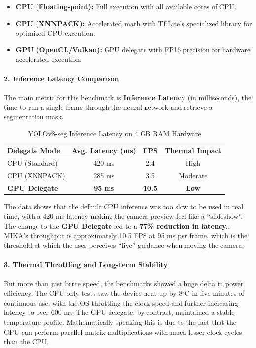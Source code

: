 \documentclass[12pt,a4paper]{report}
\begin{document}
\begin{itemize}
    \item \textbf{CPU (Floating-point):} Full execution with all available cores of CPU.
    \item \textbf{CPU (XNNPACK):} Accelerated math with TFLite’s specialized library for optimized CPU execution.
    \item \textbf{GPU (OpenCL/Vulkan):} GPU delegate with FP16 precision for hardware accelerated execution.
\end{itemize}
 
\paragraph{2. Inference Latency Comparison}
The main metric for this benchmark is \textbf{Inference Latency} (in milliseconds), the time to run a single frame through the neural network and retrieve a segmentation mask.
\begin{table}[h!]
\centering
\caption{YOLOv8-seg Inference Latency on 4 GB RAM Hardware}
\begin{tabular}{|l|c|c|c|}
\hline
\textbf{Delegate Mode} & \textbf{Avg. Latency (ms)} & \textbf{FPS} & \textbf{Thermal Impact} \\ \hline
CPU (Standard) & 420 ms & 2.4 & High \\ \hline
CPU (XNNPACK) & 285 ms & 3.5 & Moderate \\ \hline
\textbf{GPU Delegate} & \textbf{95 ms} & \textbf{10.5} & \textbf{Low} \\ \hline
\end{tabular}
\end{table}
 
The data shows that the default CPU inference was too slow to be used in real time, with a 420 ms latency making the camera preview feel like a “slideshow”. The change to the \textbf{GPU Delegate} led to a \textbf{77\% reduction in latency.}. MIKA's throughput is approximately 10.5 FPS at 95 ms per frame, which is the threshold at which the user perceives “live” guidance when moving the camera.



 
\paragraph{3. Thermal Throttling and Long-term Stability}

But more than just brute speed, the benchmarks showed a huge delta in power efficiency. The CPU-only tests saw the device heat up by 8°C in five minutes of continuous use, with the OS throttling the clock speed and further increasing latency to over 600 ms. The GPU delegate, by contrast, maintained a stable temperature profile. Mathematically speaking this is due to the fact that the GPU can perform parallel matrix multiplications with much lesser clock cycles than the CPU.
\end{document}
